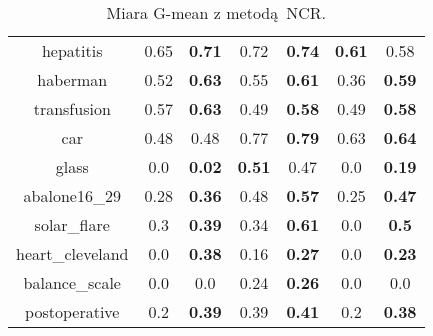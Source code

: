 \begin{table}[H]
\begin{center}
{\begin{tabular}{c|cccccc}
hepatitis&0.65&\textbf{0.71}&0.72&\textbf{0.74}&\textbf{0.61}&0.58\\%
haberman&0.52&\textbf{0.63}&0.55&\textbf{0.61}&0.36&\textbf{0.59}\\%
transfusion&0.57&\textbf{0.63}&0.49&\textbf{0.58}&0.49&\textbf{0.58}\\%
car&0.48&0.48&0.77&\textbf{0.79}&0.63&\textbf{0.64}\\%
glass&0.0&\textbf{0.02}&\textbf{0.51}&0.47&0.0&\textbf{0.19}\\%
abalone16\_29&0.28&\textbf{0.36}&0.48&\textbf{0.57}&0.25&\textbf{0.47}\\%
solar\_flare&0.3&\textbf{0.39}&0.34&\textbf{0.61}&0.0&\textbf{0.5}\\%
heart\_cleveland&0.0&\textbf{0.38}&0.16&\textbf{0.27}&0.0&\textbf{0.23}\\%
balance\_scale&0.0&0.0&0.24&\textbf{0.26}&0.0&0.0\\%
postoperative&0.2&\textbf{0.39}&0.39&\textbf{0.41}&0.2&\textbf{0.38}\\%
						\end{tabular}}
						\caption{Miara G-mean z metodą NCR.}
						\label{gmeanncr}
					\end{center}
				\end{table}		
